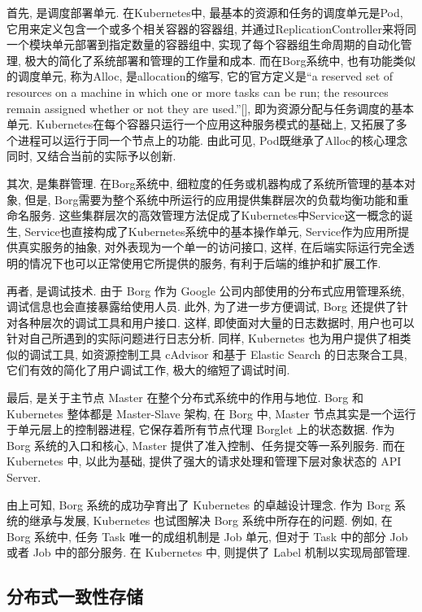 \documentclass[UTF8,a4paper]{ctexart}
\begin{document}
首先, 是调度部署单元. 在Kubernetes中, 最基本的资源和任务的调度单元是Pod, 它用来定义包含一个或多个相关容器的容器组, 并通过ReplicationController来将同一个模块单元部署到指定数量的容器组中, 实现了每个容器组生命周期的自动化管理, 极大的简化了系统部署和管理的工作量和成本. 而在Borg系统中, 也有功能类似的调度单元, 称为Alloc, 是allocation的缩写, 它的官方定义是“a reserved set of resources on a machine in which one or more tasks can be run; the resources remain assigned whether or not they are used.”[], 即为资源分配与任务调度的基本单元. Kubernetes在每个容器只运行一个应用这种服务模式的基础上, 又拓展了多个进程可以运行于同一个节点上的功能. 由此可见, Pod既继承了Alloc的核心理念同时, 又结合当前的实际予以创新.

其次, 是集群管理. 在Borg系统中, 细粒度的任务或机器构成了系统所管理的基本对象, 但是, Borg需要为整个系统中所运行的应用提供集群层次的负载均衡功能和重命名服务. 这些集群层次的高效管理方法促成了Kubernetes中Service这一概念的诞生, Service也直接构成了Kubernetes系统中的基本操作单元, Service作为应用所提供真实服务的抽象, 对外表现为一个单一的访问接口, 这样, 在后端实际运行完全透明的情况下也可以正常使用它所提供的服务, 有利于后端的维护和扩展工作.

再者, 是调试技术. 由于 Borg 作为 Google 公司内部使用的分布式应用管理系统, 调试信息也会直接暴露给使用人员. 此外, 为了进一步方便调试, Borg 还提供了针对各种层次的调试工具和用户接口. 这样, 即使面对大量的日志数据时, 用户也可以针对自己所遇到的实际问题进行日志分析. 同样, Kubernetes 也为用户提供了相类似的调试工具, 如资源控制工具 cAdvisor 和基于 Elastic Search 的日志聚合工具, 它们有效的简化了用户调试工作, 极大的缩短了调试时间.

最后, 是关于主节点 Master 在整个分布式系统中的作用与地位. Borg 和 Kubernetes 整体都是 Master-Slave 架构, 在 Borg 中, Master 节点其实是一个运行于单元层上的控制器进程, 它保存着所有节点代理 Borglet 上的状态数据. 作为 Borg 系统的入口和核心, Master 提供了准入控制、任务提交等一系列服务. 而在 Kubernetes 中, 以此为基础, 提供了强大的请求处理和管理下层对象状态的 API Server.

由上可知, Borg 系统的成功孕育出了 Kubernetes 的卓越设计理念. 作为 Borg 系统的继承与发展, Kubernetes 也试图解决 Borg 系统中所存在的问题. 例如, 在 Borg 系统中, 任务 Task 唯一的成组机制是 Job 单元, 但对于 Task 中的部分 Job 或者 Job 中的部分服务. 在 Kubernetes 中, 则提供了 Label 机制以实现局部管理.

\subsection{分布式一致性存储}
\end{document}
